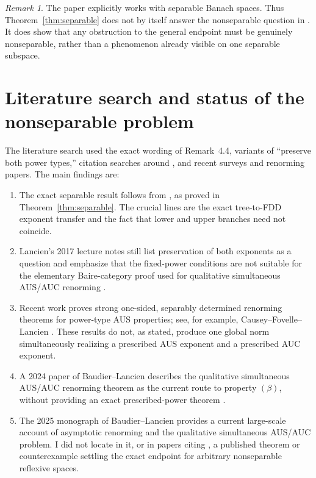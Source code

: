 \documentclass[11pt]{article}
\theoremstyle{definition}
\theoremstyle{remark}
\newtheorem{remark}[theorem]{Remark}
\begin{document}
\begin{remark}
The paper \cite{OS} explicitly works with separable Banach spaces.  Thus
Theorem~\ref{thm:separable} does not by itself answer the nonseparable
question in \cite{DKLR}.  It does show that any obstruction to the general
endpoint must be genuinely nonseparable, rather than a phenomenon already
visible on one separable subspace.
\end{remark}

\section{Literature search and status of the nonseparable problem}

The literature search used the exact wording of Remark~4.4, variants of
``preserve both power types,'' citation searches around \cite{DKLR}, and
recent surveys and renorming papers.  The main findings are:

\begin{enumerate}[label=(\arabic*)]
\item The exact separable result follows from \cite[Proposition~3.3 and
Theorem~4.1(e)]{OS}, as proved in Theorem~\ref{thm:separable}.  The crucial
lines are the exact tree-to-FDD exponent transfer and the fact that lower and
upper branches need not coincide.
\item Lancien's 2017 lecture notes still list preservation of both exponents
as a question and emphasize that the fixed-power conditions are not suitable
for the elementary Baire-category proof used for qualitative simultaneous
AUS/AUC renorming \cite{LancienSlides}.
\item Recent work proves strong one-sided, separably determined renorming
theorems for power-type AUS properties; see, for example,
Causey--Fovelle--Lancien \cite{CFL}.  These results do not, as stated, produce
one global norm simultaneously realizing a prescribed AUS exponent and a
prescribed AUC exponent.
\item A 2024 paper of Baudier--Lancien describes the qualitative
simultaneous AUS/AUC renorming theorem as the current route to property
\((\beta)\), without providing an exact prescribed-power theorem
\cite{BLLocalGlobal}.
\item The 2025 monograph of Baudier--Lancien \cite{BLbook} provides a current
large-scale account of asymptotic renorming and the qualitative simultaneous
AUS/AUC problem.  I did not locate in it, or in papers citing \cite{DKLR}, a
published theorem or counterexample settling the exact endpoint for arbitrary
nonseparable reflexive spaces.
\end{enumerate}
\end{document}

